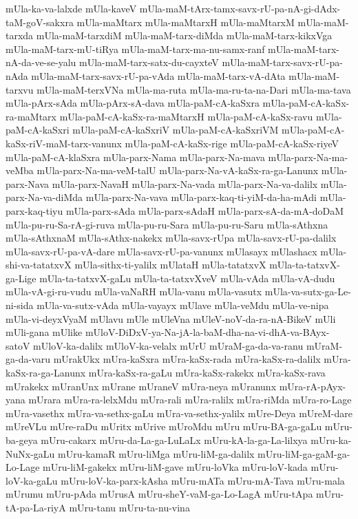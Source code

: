 {mUla-ka-va-lalxde
mUla-kaveV
mUla-maM-tArx-tamx-savx-rU-pa-nA-gi-dAdx-taM-goV-sakxra
mUla-maMtarx
mUla-maMtarxH
mUla-maMtarxM
mUla-maM-tarxda
mUla-maM-tarxdiM
mUla-maM-tarx-diMda
mUla-maM-tarx-kikxVga
mUla-maM-tarx-mU-tiRya
mUla-maM-tarx-ma-nu-samx-ranf
mUla-maM-tarx-nA-da-ve-se-yalu
mUla-maM-tarx-satx-du-cayxteV
mUla-maM-tarx-savx-rU-pa-nAda
mUla-maM-tarx-savx-rU-pa-vAda
mUla-maM-tarx-vA-dAta
mUla-maM-tarxvu
mUla-maM-terxVNa
mUla-ma-ruta
mUla-ma-ru-ta-na-Dari
mUla-ma-tava
mUla-pArx-sAda
mUla-pArx-sA-dava
mUla-paM-cA-kaSxra
mUla-paM-cA-kaSx-ra-maMtarx
mUla-paM-cA-kaSx-ra-maMtarxH
mUla-paM-cA-kaSx-ravu
mUla-paM-cA-kaSxri
mUla-paM-cA-kaSxriV
mUla-paM-cA-kaSxriVM
mUla-paM-cA-kaSx-riV-maM-tarx-vanunx
mUla-paM-cA-kaSx-rige
mUla-paM-cA-kaSx-riyeV
mUla-paM-cA-klaSxra
mUla-parx-Nama
mUla-parx-Na-mava
mUla-parx-Na-ma-veMba
mUla-parx-Na-ma-veM-talU
mUla-parx-Na-vA-kaSx-ra-ga-Lanunx
mUla-parx-Nava
mUla-parx-NavaH
mUla-parx-Na-vada
mUla-parx-Na-va-dalilx
mUla-parx-Na-va-diMda
mUla-parx-Na-vava
mUla-parx-kaq-ti-yiM-da-ha-mAdi
mUla-parx-kaq-tiyu
mUla-parx-sAda
mUla-parx-sAdaH
mUla-parx-sA-da-mA-doDaM
mUla-pu-ru-Sa-rA-gi-ruva
mUla-pu-ru-Sara
mUla-pu-ru-Saru
mUla-sAthxna
mUla-sAthxnaM
mUla-sAthx-nakekx
mUla-savx-rUpa
mUla-savx-rU-pa-dalilx
mUla-savx-rU-pa-vA-dare
mUla-savx-rU-pa-vanunx
mUlasayx
mUlashacx
mUla-shi-va-tatatxvX
mUla-sithx-ti-yalilx
mUlataH
mUla-tatatxvX
mUla-ta-tatxvX-ga-Lige
mUla-ta-tatxvX-gaLu
mUla-ta-tatxvXveV
mUla-vAda
mUla-vA-dudu
mUla-vA-gi-ru-vudu
mUla-vaNaRH
mUla-vanu
mUla-vasutx
mUla-va-sutx-ga-Le-ni-sida
mUla-va-sutx-vAda
mUla-vayayx
mUlave
mUla-veMdu
mUla-ve-nipa
mUla-vi-deyxVyaM
mUlavu
mUle
mUleVna
mUleV-noV-da-ra-nA-BikeV
mUli
mUli-gana
mUlike
mUloV-DiDxV-ya-Na-jA-la-baM-dha-na-vi-dhA-va-BAyx-satoV
mUloV-ka-dalilx
mUloV-ka-velalx
mUrU
mUraM-ga-da-va-ranu
mUraM-ga-da-varu
mUrakUkx
mUra-kaSxra
mUra-kaSx-rada
mUra-kaSx-ra-dalilx
mUra-kaSx-ra-ga-Lanunx
mUra-kaSx-ra-gaLu
mUra-kaSx-rakekx
mUra-kaSx-rava
mUrakekx
mUranUnx
mUrane
mUraneV
mUra-neya
mUranunx
mUra-rA-pAyx-yana
mUrara
mUra-ra-lelxMdu
mUra-rali
mUra-ralilx
mUra-riMda
mUra-ro-Lage
mUra-vasethx
mUra-va-sethx-gaLu
mUra-va-sethx-yalilx
mUre-Deya
mUreM-dare
mUreVLu
mUre-raDu
mUritx
mUrive
mUroMdu
mUru
mUru-BA-ga-gaLu
mUru-ba-geya
mUru-cakarx
mUru-da-La-ga-LuLaLx
mUru-kA-la-ga-La-lilxya
mUru-ka-NuNx-gaLu
mUru-kamaR
mUru-liMga
mUru-liM-ga-dalilx
mUru-liM-ga-gaM-ga-Lo-Lage
mUru-liM-gakekx
mUru-liM-gave
mUru-loVka
mUru-loV-kada
mUru-loV-ka-gaLu
mUru-loV-ka-parx-kAsha
mUru-mATa
mUru-mA-Tava
mUru-mala
mUrumu
mUru-pAda
mUrusA
mUru-sheY-vaM-ga-Lo-LagA
mUru-tApa
mUru-tA-pa-La-riyA
mUru-tanu
mUru-ta-nu-vina
}
